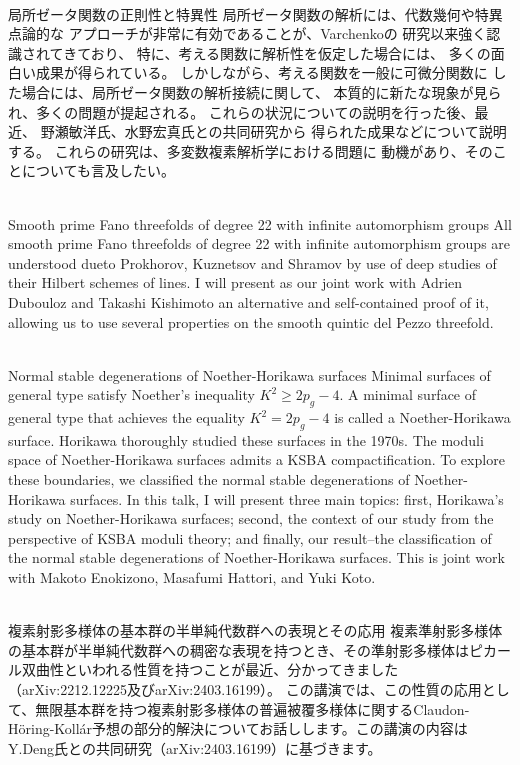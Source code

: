 \documentclass[dvipdfmx,a4paper,12pt]{article}
\theoremstyle{plain} %
\theoremstyle{definition} %
\begin{document}
\newpage

\\
局所ゼータ関数の正則性と特異性
\vskip3mm
 局所ゼータ関数の解析には、代数幾何や特異点論的な
アプローチが非常に有効であることが、Varchenkoの
研究以来強く認識されてきており、
特に、考える関数に解析性を仮定した場合には、
多くの面白い成果が得られている。
しかしながら、考える関数を一般に可微分関数に
した場合には、局所ゼータ関数の解析接続に関して、
本質的に新たな現象が見られ、多くの問題が提起される。
これらの状況についての説明を行った後、最近、
野瀬敏洋氏、水野宏真氏との共同研究から
得られた成果などについて説明する。
これらの研究は、多変数複素解析学における問題に
動機があり、そのことについても言及したい。
\vskip10mm

\vskip3mm
\\
Smooth prime Fano threefolds of degree 22 with infinite automorphism groups 
\vskip3mm
All smooth prime Fano threefolds of degree 22 with infinite automorphism groups
are understood dueto Prokhorov, Kuznetsov and Shramov by use of deep studies of
their Hilbert schemes of lines. I will present as our joint work with
Adrien Dubouloz and Takashi Kishimoto an alternative and self-contained
proof of it, allowing us to use several properties on
the smooth quintic del Pezzo threefold. 

\vskip8mm

\\
Normal stable degenerations of Noether-Horikawa surfaces
\vskip3mm
Minimal surfaces of general type satisfy Noether's inequality $K^2 \geq 2p_g - 4$. A minimal surface of general type that achieves the equality $K^2 = 2p_g - 4$ is called a Noether-Horikawa surface. Horikawa thoroughly studied these surfaces in the 1970s.
The moduli space of Noether-Horikawa surfaces admits a KSBA compactification. To explore these boundaries, we classified the normal stable degenerations of Noether-Horikawa surfaces.
In this talk, I will present three main topics: first, Horikawa's study on Noether-Horikawa surfaces; second, the context of our study from the perspective of KSBA moduli theory; and finally, our result--the classification of the normal stable degenerations of Noether-Horikawa surfaces.
This is joint work with Makoto Enokizono, Masafumi Hattori, and Yuki Koto.
\vskip8mm
\newpage

\\
複素射影多様体の基本群の半単純代数群への表現とその応用
\vskip3mm
複素準射影多様体の基本群が半単純代数群への稠密な表現を持つとき、その準射影多様体はピカール双曲性といわれる性質を持つことが最近、分かってきました（arXiv:2212.12225及びarXiv:2403.16199）。
この講演では、この性質の応用として、無限基本群を持つ複素射影多様体の普遍被覆多様体に関するClaudon-H\"oring-Koll\'ar予想の部分的解決についてお話しします。この講演の内容はY.Deng氏との共同研究（arXiv:2403.16199）に基づきます。
\vskip8mm
\end{document}
